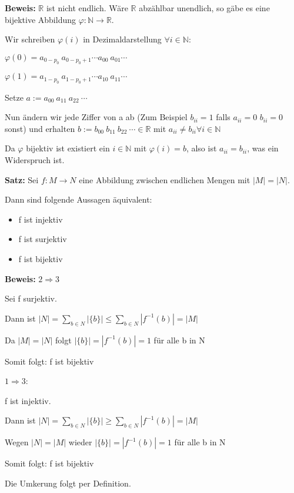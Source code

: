 \documentclass[pdftex,12pt,a4paper,fleqn]{scrartcl}
\begin{document}
\textbf{Beweis:} $\mathbb{R}$ ist nicht endlich. Wäre $\mathbb{R}$ abzählbar unendlich, so gäbe es eine bijektive Abbildung $\varphi: \mathbb{N} \rightarrow \mathbb{R}$.

Wir schreiben $\varphi(i)$ in Dezimaldarstellung $\forall i \in \mathbb{N}$:

$\varphi(0) = a_{0-p_0}\ a_{0-p_0+1} \cdots a_{00}\ a_{01} \cdots$

$\varphi(1) = a_{1-p_0}\ a_{1-p_0+1} \cdots a_{10}\ a_{11} \cdots$

Setze $a:= a_{00}\ a_{11}\ a_{22}\ \cdots$

Nun ändern wir jede Ziffer von a ab (Zum Beispiel $b_{ii}=1$ falls $a_{ii}=0$ $b_{ii}=0$ sonst) und erhalten $b:= b_{00}\ b_{11}\ b_{22}\ \cdots \in \mathbb{R}$ mit $a_{ii} \neq b_{ii} \forall i \in \mathbb{N}$

Da $\varphi$ bijektiv ist existiert ein $i \in \mathbb{N}$ mit $\varphi(i) = b$, also ist $a_{ii}=b_{ii}$, was ein Widerspruch ist.

\newpage

\textbf{Satz:} Sei $f: M \rightarrow N$ eine Abbildung zwischen endlichen Mengen mit $|M|=|N|$.

Dann sind folgende Aussagen äquivalent:

\begin{itemize}
    \item f ist injektiv
    \item f ist surjektiv
    \item f ist bijektiv
\end{itemize}
 
\textbf{Beweis:} $2 \Rightarrow 3$

Sei f surjektiv. 

Dann ist $|N|=\displaystyle\sum_{b \in N} |\{b\}| \leq \displaystyle\sum_{b \in N} |f^{-1}(b)| = |M|$

Da $|M| = |N|$ folgt $|\{b\}| = |f^{-1}(b)|=1 $ für alle b in N

Somit folgt: f ist bijektiv

$1 \Rightarrow 3$:

f ist injektiv.

Dann ist $|N| = \displaystyle\sum_{b \in N} |\{b\}| \geq \displaystyle\sum_{b \in N} |f^{-1}(b)| = |M|$

Wegen $|N| = |M|$ wieder $|\{b\}| = |f^{-1}(b)| = 1$ für alle b in N

Somit folgt: f ist bijektiv

Die Umkerung folgt per Definition.
\end{document}
